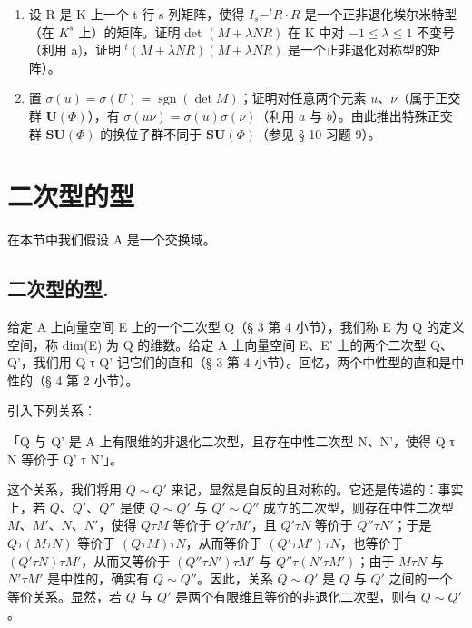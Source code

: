 \begin{enumerate}
\def\labelenumi{\alph{enumi})}
\setcounter{enumi}{1}
\item
  设 R 是 K 上一个 t 行 s 列矩阵，使得 \(I_{s} - ^{t}R \cdot R\) 是一个正非退化埃尔米特型（在 \(K^{s}\) 上）的矩阵。证明 det \((M + \lambda NR)\) 在 K 中对 \(-1 \leqslant \lambda \leqslant 1\) 不变号（利用 a)，证明 \(^{t}(M + \lambda NR)(M + \lambda NR)\) 是一个正非退化对称型的矩阵）。
\item
  置 \(\sigma(u) = \sigma(U) = \operatorname{sgn}(\det M)\)；证明对任意两个元素 \(u\)、\(\nu\)（属于正交群 \(\mathbf{U}(\Phi)\)），有 \(\sigma(u\nu) = \sigma(u)\sigma(\nu)\)（利用 \(a\) 与 \(b\)）。由此推出特殊正交群 \(\mathbf{SU}(\Phi)\) 的换位子群不同于 \(\mathbf{SU}(\Phi)\)（参见 § 10 习题 9）。
\end{enumerate}

\section{二次型的型}

在本节中我们假设 A 是一个交换域。

\subsection{二次型的型.}

  给定 A 上向量空间 E 上的一个二次型 Q（§ 3 第 4 小节），我们称 E 为 Q 的定义空间，称 dim(E) 为 Q 的维数。给定 A 上向量空间 E、E' 上的两个二次型 Q、Q'，我们用 Q τ Q' 记它们的直和（§ 3 第 4 小节）。回忆，两个中性型的直和是中性的（§ 4 第 2 小节）。

  引入下列关系：

「Q 与 Q' 是 A 上有限维的非退化二次型，且存在中性二次型 N、N'，使得 Q τ N 等价于 Q' τ N'」。

  这个关系，我们将用 \(Q \sim Q'\) 来记，显然是自反的且对称的。它还是传递的：事实上，若 \(Q\)、\(Q'\)、\(Q''\) 是使 \(Q \sim Q'\) 与 \(Q' \sim Q''\) 成立的二次型，则存在中性二次型 \(M\)、\(M'\)、\(N\)、\(N'\)，使得 \(Q \tau M\) 等价于 \(Q' \tau M'\)，且 \(Q' \tau N\) 等价于 \(Q'' \tau N'\)；于是 \(Q \tau (M \tau N)\) 等价于 \((Q \tau M) \tau N\)，从而等价于 \((Q' \tau M') \tau N\)，也等价于 \((Q' \tau N) \tau M'\)，从而又等价于 \((Q'' \tau N') \tau M'\) 与 \(Q'' \tau (N' \tau M')\)；由于 \(M \tau N\) 与 \(N' \tau M'\) 是中性的，确实有 \(Q \sim Q''\)。因此，关系 \(Q \sim Q'\) 是 \(Q\) 与 \(Q'\) 之间的一个等价关系。显然，若 \(Q\) 与 \(Q'\) 是两个有限维且等价的非退化二次型，则有 \(Q \sim Q'\)。

